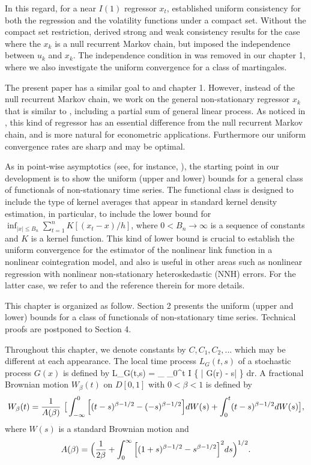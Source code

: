 In this regard, for a near $I(1)$ regressor $x_t$, \cite{wangwang2012} established uniform consistency for  both the regression and the volatility functions under  a compact set. Without the compact set restriction,  \cite{gaolitjostheim2011} derived strong and weak consistency results for the case where the $x_k$ is a null recurrent Markov chain,  but  imposed the independence between $u_k$ and $x_k$. The independence condition in \cite{gaolitjostheim2011} was removed in our chapter 1, where we also investigate the uniform convergence for a class of martingales.

 The present paper has a similar goal to \cite{gaolitjostheim2011} and chapter 1. However, instead of the null recurrent Markov chain, we work on the
  general non-stationary regressor $x_k$ that is similar to \cite{wangphillips2010a}, including a partial sum of general linear process. As noticed in \cite{wangphillips2010a}, this kind of regressor has an essential difference from the null recurrent Markov chain, and is more natural for econometric applications. Furthermore  our uniform convergence rates are sharp and may be optimal.

 As in point-wise asymptotics (see, for instance, \cite{wangphillips2010a}), the starting point in our development is to show the uniform (upper and lower) bounds for a general class of  functionals  of non-stationary time series. The functional class is designed to include the type of kernel averages that appear in standard kernel density estimation, in particular, to include the lower bound for $\inf_{|x| \le B_n}\sum_{t=1}^{n}K[(x_{t}-x)/h]$, where $0< B_n\to \infty$ is a sequence of constants and $K$ is a kernel function. This kind of lower bound is crucial to establish the uniform convergence for the estimator of the nonlinear link function in a nonlinear cointegration model, and also is useful in other areas such as nonlinear regression with nonlinear non-stationary heteroskedastic (NNH) errors. For the latter case, we refer to \cite{wangwang2012} and the reference therein for more details.

This chapter is organized as follow. Section 2 presents the uniform (upper and lower) bounds for a class of functionals  of non-stationary time series. Technical proofs are postponed to Section 4.

Throughout this chapter, we denote constants by $C, C_1, C_2,...$ which may be different at each appearance. The local time process  $L_G(t,s)$ of a stochastic process $G(x)$ is defined by
\bestar
L_G(t,s) = \lim_{\ep {}}  \int_0^t I \big \{ | G(r) - s| \le \ep \big \} dr.
\eestar
A fractional Brownian motion $W_{\beta}(t)$ on $D[0,1]$ with $0<\beta<1$  is defined by
\begin{eqnarray*}
W_{\beta}(t)= \frac 1{A(\beta)}\ \big [ \int_{-\infty}^0\Big[(t-s)^{%
\beta-1/2}-(-s)^{\beta-1/2}\Big]dW(s)+
\int_{0}^t(t-s)^{\beta-1/2}dW(s)\big ],
\end{eqnarray*}
where $W(s)$ is a standard Brownian motion and
\begin{equation*}
A(\beta)=\Big (\frac 1{2\beta}+\int_{0}^{\infty}\Big[(1+s)^{\beta-1/2}-s^{%
\beta-1/2}\Big]^2ds\Big)^{1/2}.
\end{equation*}

